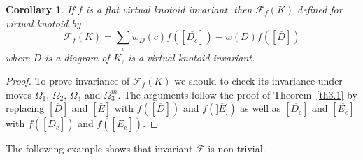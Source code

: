\documentclass[11pt]{amsart}
\theoremstyle{noparens}
\newtheorem{corollary}{Corollary}[section]
\numberwithin{equation}{section}
\numberwithin{equation}{section}
\begin{document}
\begin{corollary}
If $f$ is a flat virtual knotoid invariant, then $\mathcal{F}_f (K)$ defined for virtual knotoid by 
\begin{equation}
\mathcal{F}_f  (K) = \sum_{c} w_D(c) f([\overline{D_c}]) - w(D) f([\overline{D}]) \label{eqn:f}
\end{equation} 
where $D$ is a diagram of $K$, is a virtual knotoid invariant.
\end{corollary}

\begin{proof} To prove invariance of $\mathcal{F}_f (K)$ we should to check its invariance under moves $\Omega_1$, $\Omega_2$, $\Omega_3$ and $\Omega^m_3$. The arguments follow the proof of Theorem~\ref{th3.1} by replacing $[\overline{D}]$ and $[\overline{E}]$ with $f([\overline{D}])$ and  $f (]\overline{E}])$ as well as $[\overline{D_c}]$ and $[\overline{E_e}]$ with  $f([\overline{D_c}])$ and $f([\overline{E_e}])$. 
\end{proof} 

The following example shows that invariant $\mathcal{F}$ is non-trivial.
\end{document}
